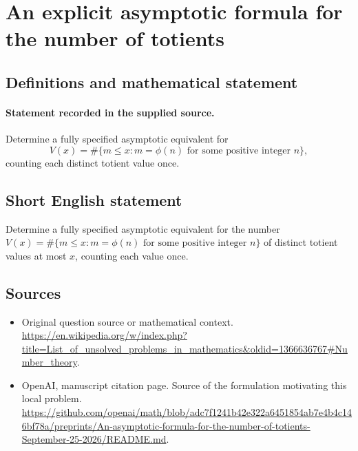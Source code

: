 \documentclass[11pt]{article}
\begin{document}
\section*{An explicit asymptotic formula for the number of totients}\label{statement}
\subsection{Definitions and mathematical statement}
\paragraph{Statement recorded in the supplied source.}
Determine a fully specified asymptotic equivalent for
\[
V(x)=\#\{m\leq x:m=\phi(n)\text{ for some positive integer }n\},
\]
counting each distinct totient value once.
\subsection{Short English statement}
Determine a fully specified asymptotic equivalent for the number $V(x)=\#\{m\leq x:m=\phi(n)\text{ for some positive integer }n\}$ of distinct totient values at most $x$, counting each value once.
\subsection{Sources}
\begin{itemize}
\item[S1] Original question source or mathematical context.
\url{https://en.wikipedia.org/w/index.php?title=List_of_unsolved_problems_in_mathematics&oldid=1366636767#Number_theory}.
\item[S2] OpenAI, manuscript citation page. Source of the formulation motivating this local problem.
\url{https://github.com/openai/math/blob/adc7f1241b42e322a6451854ab7e4b4c146bf78a/preprints/An-asymptotic-formula-for-the-number-of-totients-September-25-2026/README.md}.
\end{itemize}
\end{document}
